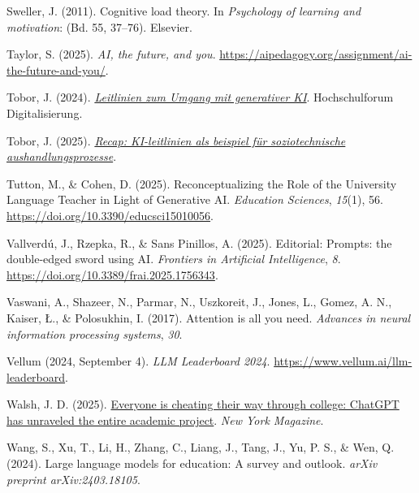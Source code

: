 \documentclass[
  ngerman,
  letterpaper,
  DIV=11]{scrreprt}
\newlength{\cslhangindent}
\newenvironment{CSLReferences}[2] %
 {\begin{list}{}{%
  \setlength{\itemindent}{0pt}
  \setlength{\leftmargin}{0pt}
  \setlength{\parsep}{0pt}
  \ifodd #1
   \setlength{\leftmargin}{\cslhangindent}
   \setlength{\itemindent}{-1\cslhangindent}
  \fi
  \setlength{\itemsep}{#2\baselineskip}}}
 {\end{list}}
\begin{document}
\begin{CSLReferences}{1}{0}
Sweller, J. (2011). Cognitive load theory. In \emph{Psychology of
learning and motivation}: (Bd. 55, 37--76). Elsevier.

Taylor, S. (2025). \emph{AI, the future, and you}.
\url{https://aipedagogy.org/assignment/ai-the-future-and-you/}.

Tobor, J. (2024).
\emph{\href{https://hochschulforumdigitalisierung.de/wp-content/uploads/2024/02/HFD_Blickpunkt_KI-Leitlinien_final.pdf}{Leitlinien
zum Umgang mit generativer KI}}. Hochschulforum Digitalisierung.

Tobor, J. (2025).
\emph{\href{https://hochschulforumdigitalisierung.de/news/blickpunkt-ki-leitlinien/}{Recap:
KI-leitlinien als beispiel für soziotechnische aushandlungsprozesse}}.

Tutton, M., \& Cohen, D. (2025). Reconceptualizing the Role of the
University Language Teacher in Light of Generative AI. \emph{Education
Sciences}, \emph{15}(1), 56.
\url{https://doi.org/10.3390/educsci15010056}.

Vallverdú, J., Rzepka, R., \& Sans Pinillos, A. (2025). Editorial:
Prompts: the double-edged sword using AI. \emph{Frontiers in Artificial
Intelligence}, \emph{8}.
\url{https://doi.org/10.3389/frai.2025.1756343}.

Vaswani, A., Shazeer, N., Parmar, N., Uszkoreit, J., Jones, L., Gomez,
A. N., Kaiser, Ł., \& Polosukhin, I. (2017). Attention is all you need.
\emph{Advances in neural information processing systems}, \emph{30}.

Vellum (2024, September 4). \emph{LLM Leaderboard 2024}.
\url{https://www.vellum.ai/llm-leaderboard}.

Walsh, J. D. (2025).
\href{https://nymag.com/intelligencer/article/openai-chatgpt-ai-cheating-education-college-students-school.html}{Everyone
is cheating their way through college: ChatGPT has unraveled the entire
academic project}. \emph{New York Magazine}.

Wang, S., Xu, T., Li, H., Zhang, C., Liang, J., Tang, J., Yu, P. S., \&
Wen, Q. (2024). Large language models for education: A survey and
outlook. \emph{arXiv preprint arXiv:2403.18105}.


\end{CSLReferences}
\end{document}
